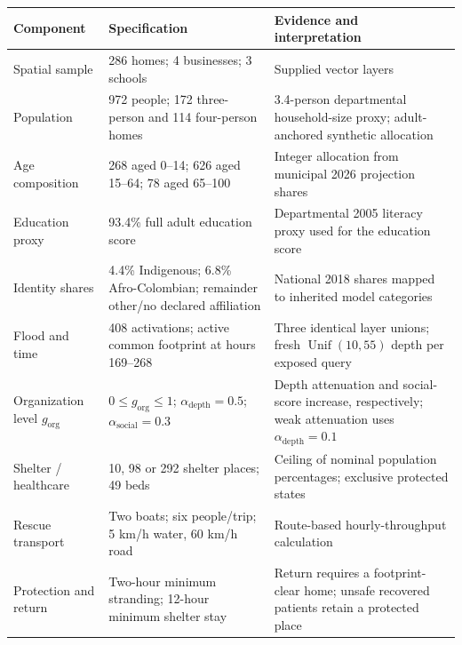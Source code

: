 \begin{tabular}{@{}p{.24\linewidth}p{.32\linewidth}p{.36\linewidth}@{}}
\toprule
Component & Specification & Evidence and interpretation \\
\midrule
Spatial sample & 286 homes; 4 businesses; 3 schools & Supplied vector layers \\
Population & 972 people; 172 three-person and 114 four-person homes & 3.4-person departmental household-size proxy; adult-anchored synthetic allocation \\
Age composition & 268 aged 0--14; 626 aged 15--64; 78 aged 65--100 & Integer allocation from municipal 2026 projection shares \\
Education proxy & 93.4\% full adult education score & Departmental 2005 literacy proxy used for the education score \\
Identity shares & 4.4\% Indigenous; 6.8\% Afro-Colombian; remainder other/no declared affiliation & National 2018 shares mapped to inherited model categories \\
Flood and time & 408 activations; active common footprint at hours 169--268 & Three identical layer unions; fresh $\operatorname{Unif}(10,55)$ depth per exposed query \\
Organization level $g_{\mathrm{org}}$ & $0\leq g_{\mathrm{org}}\leq1$; $\alpha_{\mathrm{depth}}=0.5$; $\alpha_{\mathrm{social}}=0.3$ & Depth attenuation and social-score increase, respectively; weak attenuation uses $\alpha_{\mathrm{depth}}=0.1$ \\
Shelter / healthcare & 10, 98 or 292 shelter places; 49 beds & Ceiling of nominal population percentages; exclusive protected states \\
Rescue transport & Two boats; six people/trip; 5 km/h water, 60 km/h road & Route-based hourly-throughput calculation \\
Protection and return & Two-hour minimum stranding; 12-hour minimum shelter stay & Return requires a footprint-clear home; unsafe recovered patients retain a protected place \\
\bottomrule
\end{tabular}
